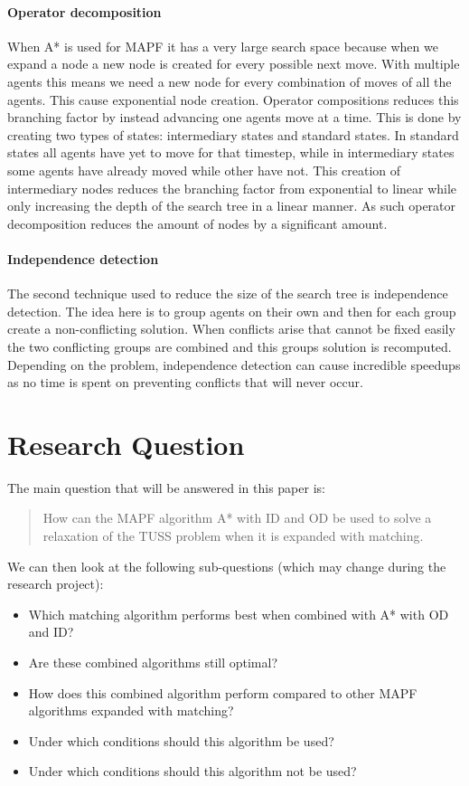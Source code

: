\documentclass[english]{article}
\begin{document}
\paragraph{Operator decomposition}
When A* is used for MAPF it has a very large search space because when we expand a node a new node is created for every possible next move. 
With multiple agents this means we need a new node for every combination of moves of all the agents. 
This cause exponential node creation.
Operator compositions reduces this branching factor by instead advancing one agents move at a time\cite{AStarIDOD_standley_2010}.
This is done by creating two types of states: intermediary states and standard states.
In standard states all agents have yet to move for that timestep, while in intermediary states some agents have already moved while other have not.
This creation of intermediary nodes reduces the branching factor from exponential to linear while only increasing the depth of the search tree in a linear manner.
As such operator decomposition reduces the amount of nodes by a significant amount.

\paragraph{Independence detection}
The second technique used to reduce the size of the search tree is independence detection.
The idea here is to group agents on their own and then for each group create a non-conflicting solution.
When conflicts arise that cannot be fixed easily the two conflicting groups are combined and this groups solution is recomputed.
Depending on the problem, independence detection can cause incredible speedups as no time is spent on preventing conflicts that will never occur.

\section{Research Question}
The main question that will be answered in this paper is: 
\begin{quote}
	How can the MAPF algorithm A* with ID and OD be used to solve a relaxation of the TUSS problem when it is expanded with matching.
\end{quote}
We can then look at the following sub-questions (which may change during the research project):
\begin{itemize}
	\item Which matching algorithm performs best when combined with A* with OD and ID?
	\item Are these combined algorithms still optimal?
	\item How does this combined algorithm perform compared to other MAPF algorithms expanded with matching?
	\item Under which conditions should this algorithm be used?
	\item Under which conditions should this algorithm not be used?
\end{itemize}
\end{document}
